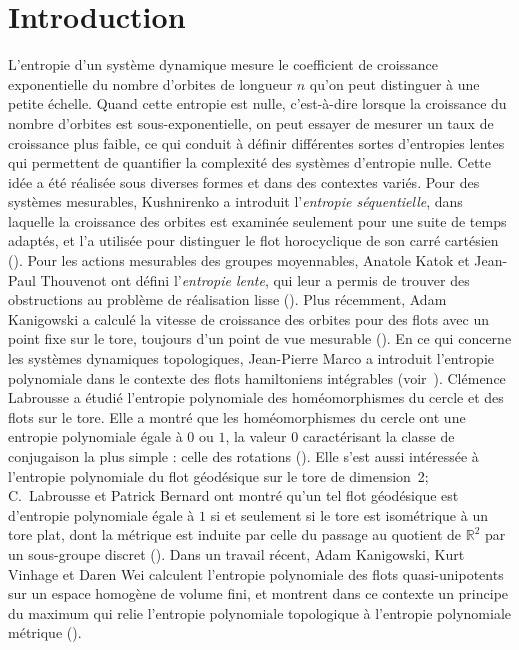 \section{Introduction}

L'entropie d'un système dynamique mesure le coefficient de croissance exponentielle du nombre d'orbites de longueur $n$ qu'on peut distinguer à une petite échelle. Quand cette entropie est nulle, c'est-à-dire lorsque la croissance du nombre d'orbites est sous-exponentielle, on peut essayer de mesurer un taux de croissance plus faible, ce qui conduit à définir différentes sortes d'entropies \og lentes \fg{} qui permettent de quantifier la complexité des systèmes d'entropie nulle. Cette idée a été réalisée sous diverses formes et dans des contextes variés. Pour des systèmes mesurables, Kushnirenko a introduit l'\emph{entropie séquentielle}, dans laquelle la croissance des orbites est examinée seulement pour une suite de temps adaptés, et l'a utilisée pour distinguer le flot horocyclique de son carré cartésien (\cite{Kus67}). Pour les actions mesurables des groupes moyennables, Anatole Katok et Jean-Paul Thouvenot ont défini l'\emph{entropie lente}, qui leur a permis de trouver des obstructions au problème de réalisation lisse (\cite{KatTho97}). Plus récemment, Adam Kanigowski a calculé la vitesse de croissance des orbites pour des flots avec un point fixe sur le tore, toujours d'un point de vue mesurable (\cite{Kan18}). En ce qui concerne les systèmes dynamiques topologiques, Jean-Pierre Marco a introduit l'entropie polynomiale dans le contexte des flots hamiltoniens intégrables (voir~\cite{Mar13}). Clémence Labrousse a étudié l'entropie polynomiale des homéomorphismes du cercle et des flots sur le tore. Elle a montré que les homéomorphismes du cercle ont une entropie polynomiale égale à $0$ ou $1$, la valeur $0$ caractérisant la classe de conjugaison la plus simple : celle des rotations (\cite{Lab13}). Elle s'est aussi intéressée à l'entropie polynomiale du flot géodésique sur le tore de dimension~2; C.~Labrousse et Patrick Bernard ont montré qu'un tel flot géodésique est d'entropie polynomiale égale à $1$ si et seulement si le tore est isométrique à un tore plat, dont la métrique est induite par celle du passage au quotient de $\mathbb R^2$ par un sous-groupe discret (\cite{BerLab16}). Dans un travail récent, Adam Kanigowski, Kurt Vinhage et Daren Wei calculent l'entropie polynomiale des flots quasi-unipotents sur un espace homogène de volume fini, et montrent dans ce contexte un principe du maximum qui relie l'entropie polynomiale topologique à l'entropie polynomiale métrique (\cite{KVW18}).

